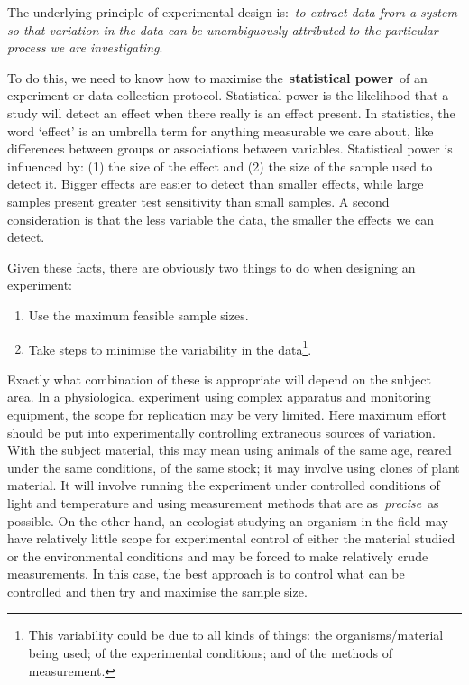 \documentclass[
]{book}
\providecommand{\tightlist}{%
  \setlength{\itemsep}{0pt}\setlength{\parskip}{0pt}}
\begin{document}
The underlying principle of experimental design is:~\emph{to extract data from a system so that variation in the data can be unambiguously attributed to the particular process we are investigating}.

To do this, we need to know how to maximise the~\textbf{statistical power}~of an experiment or data collection protocol. Statistical power is the likelihood that a study will detect an effect when there really is an effect present. In statistics, the word `effect' is an umbrella term for anything measurable we care about, like differences between groups or associations between variables. Statistical power is influenced by: (1) the size of the effect and (2) the size of the sample used to detect it. Bigger effects are easier to detect than smaller effects, while large samples present greater test sensitivity than small samples. A second consideration is that the less variable the data, the smaller the effects we can detect.

Given these facts, there are obviously two things to do when designing an experiment:

\begin{enumerate}
\def\labelenumi{\arabic{enumi}.}
\tightlist
\item
  Use the maximum feasible sample sizes.
\item
  Take steps to minimise the variability in the data\footnote{This variability could be due to all kinds of things: the organisms/material being used; of the experimental conditions; and of the methods of measurement.}.
\end{enumerate}

Exactly what combination of these is appropriate will depend on the subject area. In a physiological experiment using complex apparatus and monitoring equipment, the scope for replication may be very limited. Here maximum effort should be put into experimentally controlling extraneous sources of variation. With the subject material, this may mean using animals of the same age, reared under the same conditions, of the same stock; it may involve using clones of plant material. It will involve running the experiment under controlled conditions of light and temperature and using measurement methods that are as~\emph{precise}~as possible. On the other hand, an ecologist studying an organism in the field may have relatively little scope for experimental control of either the material studied or the environmental conditions and may be forced to make relatively crude measurements. In this case, the best approach is to control what can be controlled and then try and maximise the sample size.
\end{document}
